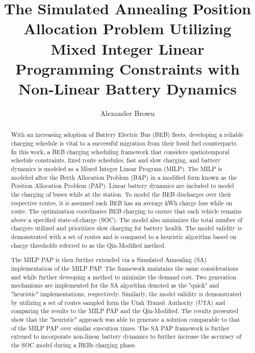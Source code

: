 \documentclass[ee,thesis]{usuthesis}
\author{Alexander Brown}
\date{}
\title{The Simulated Annealing Position Allocation Problem Utilizing Mixed Integer Linear Programming Constraints with Non-Linear Battery Dynamics}
\begin{document}
\newtheorem*{lemma}{Lemma}

\let\ref\autoref                            %

\preliminaries   %

\maketitle

\tableofcontents
\listoftables
\listoffigures

\begin{abstract}

With an increasing adoption of Battery Electric Bus (BEB) fleets, developing a reliable charging schedule is vital to a successful migration from their fossil fuel counterparts. In this work, a BEB charging scheduling framework that considers spatiotemporal schedule constraints, fixed route schedules, fast and slow charging, and battery dynamics is modeled as a Mixed Integer Linear Program (MILP). The MILP is modeled after the Berth Allocation Problem (BAP) in a modified form known as the Position Allocation Problem (PAP). Linear battery dynamics are included to model the charging of buses while at the station. To model the BEB discharges over their respective routes, it is assumed each BEB has an average kWh charge loss while on route. The optimization coordinates BEB charging to ensure that each vehicle remains above a specified state-of-charge (SOC). The model also minimizes the total number of chargers utilized and prioritizes slow charging for battery health. The model validity is demonstrated with a set of routes and is compared to a heuristic algorithm based on charge thresholds referred to as the Qin-Modified method.

The MILP PAP is then further extended via a Simulated Annealing (SA) implementation of the MILP PAP. The framework maintains the same considerations and while further deveoping a method to minimize the demand cost. Two generation mechanisms are implemented for the SA algorithm denoted as the "quick" and "heuristic" implementations, respectively. Similarly, the model validity is demonstrated by utilizing a set of routes sampled form the Utah Transit Authority (UTA) and comparing the results to the MILP PAP and the Qin-Modified. The results presented show that the "heuristic" approach was able to generate a solution comparable to that of the MILP PAP over similar execution times. The SA PAP framework is further extened to incorporate non-linear battery dynamics to further increase the accuracy of the SOC model during a BEBs charging phase.
\end{abstract}
\end{document}
